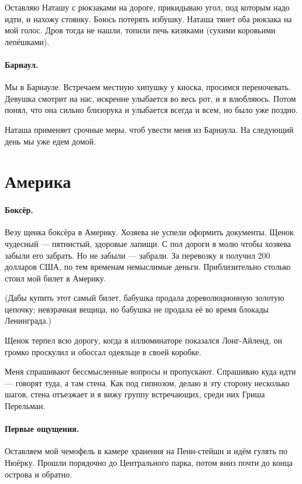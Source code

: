 \documentclass{book}
\begin{document}
Оставляю Наташу с рюкзаками на дороге, прикидываю угол, под которым надо идти, и нахожу стоянку.
Боюсь потерять избушку.
Наташа тянет оба рюкзака на мой голос.
Дров тогда не нашли, топили печь кизяками (сухими коровьими лепёшками).

\paragraph{Барнаул.}
Мы в Барнауле.
Встречаем местную хипушку у киоска, просимся переночевать.
Девушка смотрит на нас, искренне улыбается во весь рот, и я влюбляюсь.
Потом понял, что она сильно близорука и улыбается всегда и всем, но было уже поздно.

Наташа применяет срочные меры, чтоб увести меня из Барнаула.
На следующий день мы уже едем домой.

\section*{Америка}

\paragraph{Боксёр.}
Везу щенка боксёра в Америку.
Хозяева не успели оформить документы.
Щенок чудесный --- пятнистый, здоровые лапищи.
С пол дороги я молю чтобы хозяева забыли его забрать.
Но не забыли --- забрали.
За перевозку я получил 200 долларов США, по тем временам немыслимые деньги.
Приблизительно столько стоил мой билет в Америку.

(Дабы купить этот самый билет, бабушка продала дореволюционную золотую цепочку;
невзрачная вещица, но бабушка не продала её во время блокады Ленинграда.)

Щенок терпел всю дорогу, когда в иллюминаторе показался Лонг-Айленд, он громко проскулил и обоссал одеяльце в своей коробке.

Меня спрашивают бессмысленные вопросы и пропускают.
Спрашиваю куда идти --- говорят туда, а там стена.
Как под гипнозом, делаю в эту сторону несколько шагов, стена отъезжает и я вижу группу встречающих, среди них Гриша Перельман.

\paragraph{Первые ощущения.}
Оставляем мой чемофель в камере хранения на Пенн-стейшн и идём гулять по Нюёрку.
Прошли порядочно до Центрального парка, потом вниз почти до конца острова и обратно.
\end{document}
